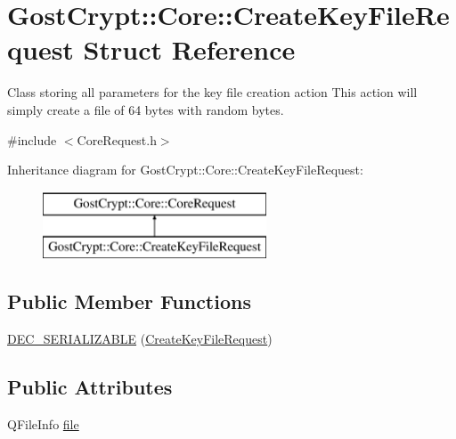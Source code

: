 \hypertarget{struct_gost_crypt_1_1_core_1_1_create_key_file_request}{}\section{Gost\+Crypt\+:\+:Core\+:\+:Create\+Key\+File\+Request Struct Reference}
\label{struct_gost_crypt_1_1_core_1_1_create_key_file_request}


Class storing all parameters for the key file creation action This action will simply create a file of 64 bytes with random bytes.  




{\ttfamily \#include $<$Core\+Request.\+h$>$}

Inheritance diagram for Gost\+Crypt\+:\+:Core\+:\+:Create\+Key\+File\+Request\+:\begin{figure}[H]
\begin{center}
\leavevmode
\includegraphics[height=2.000000cm]{struct_gost_crypt_1_1_core_1_1_create_key_file_request}
\end{center}
\end{figure}
\subsection*{Public Member Functions}
\begin{DoxyCompactItemize}
\item 
\hyperlink{struct_gost_crypt_1_1_core_1_1_create_key_file_request_af13579c961b23eeee82439accc2c93f6}{D\+E\+C\+\_\+\+S\+E\+R\+I\+A\+L\+I\+Z\+A\+B\+LE} (\hyperlink{struct_gost_crypt_1_1_core_1_1_create_key_file_request}{Create\+Key\+File\+Request})
\end{DoxyCompactItemize}
\subsection*{Public Attributes}
\begin{DoxyCompactItemize}
\item 
Q\+File\+Info \hyperlink{struct_gost_crypt_1_1_core_1_1_create_key_file_request_a096fe4707eac28e43822f16e19d169fa}{file}
\end{DoxyCompactItemize}



